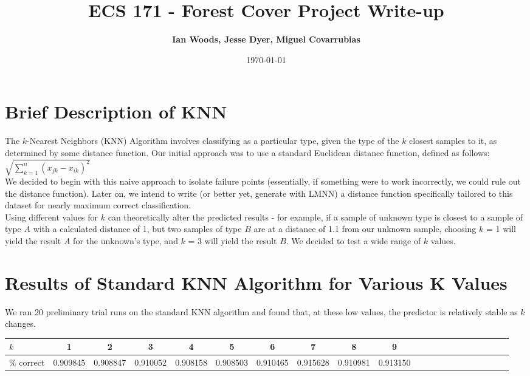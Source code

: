 \documentclass[11pt]{article}
\title{\bf ECS 171 - Forest Cover Project Write-up\\[2ex] }
\date{\today}
\author{\bf Ian Woods, Jesse Dyer, Miguel Covarrubias}
\begin{document}
\maketitle


\section*{Brief Description of KNN} 
The $k$-Nearest Neighbors (KNN) Algorithm involves classifying as a particular type, given the type of the $k$ closest samples to it, as determined by some distance function. Our initial approach was to use a standard Euclidean distance function, defined as follows:
\\
$\sqrt{\sum\limits_{k = 1}^n (x_{jk} - x_{ik})^2}$
\\
We decided to begin with this naive approach to isolate failure points (essentially, if something were to work incorrectly, we could rule out the distance function).
Later on, we intend to write (or better yet, generate with LMNN) a distance function specifically tailored to this dataset for nearly maximum correct classification.
\\
Using different values for $k$ can theoretically alter the predicted results - for example, if a sample of unknown type is closest to a sample of type $A$ with a calculated distance of 1, but two samples of type $B$ are at a distance of 1.1 from our unknown sample, choosing $k$ = 1 will yield the result $A$ for the unknown's type, and $k$ = 3 will yield the result $B$. We decided to test a wide range of $k$ values.
\section*{Results of Standard KNN Algorithm for Various K Values}
We ran 20 preliminary trial runs on the standard KNN algorithm and found that, at these low values, the predictor is relatively stable as $k$ changes. 

\begin{center}
  \begin{tabular}{ l | c | c | c | c | c | c | c | c | c | c | c | c | c | c | c | c | c | c | c | r }
    \hline
    $k$ & 1 & 2 & 3 & 4 & 5 & 6 & 7 & 8 & 9 \\ \hline
    \% correct & 0.909845 & 0.908847 & 0.910052 & 0.908158 & 0.908503 & 0.910465 & 0.915628 & 0.910981 & 0.913150 \\
    \hline
  \end{tabular}
\end{center}
\end{document}
